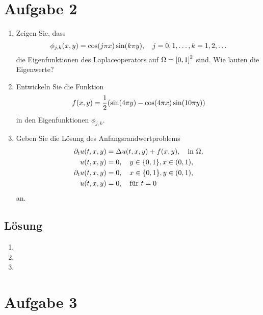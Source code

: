 \documentclass{exercise}
\begin{document}
    \section*{Aufgabe 2}

    \begin{problem}
        \begin{enumerate}
            \item Zeigen Sie, dass
            \[
                \phi_{j, k}\parentheses*{x, y} = \cos\parentheses*{j\pi x}\sin\parentheses*{k\pi y}, \quad j = 0, 1, \ldots, k = 1, 2, \ldots
            \]
            die Eigenfunktionen des Laplaceoperators auf \(\Omega = \brackets*{0, 1}^2\) sind.
            Wie lauten die Eigenwerte?
            \item Entwickeln Sie die Funktion
            \[
                f\parentheses*{x, y} = \frac{1}{2}\parentheses*{\sin\parentheses*{4\pi y} - \cos\parentheses*{4\pi x}\sin\parentheses*{10\pi y}}
            \]
            in den Eigenfunktionen \(\phi_{j, k}\).
            \item Geben Sie die Lösung des Anfangsrandwertproblems
            \begin{align*}
                \partial_t u\parentheses*{t, x, y} &= \Delta u\parentheses*{t, x, y} + f\parentheses*{x, y}, \quad \text{in }\Omega,\\
                u\parentheses*{t, x, y} &= 0, \quad y \in \braces*{0, 1}, x \in \parentheses*{0, 1},\\
                \partial_t u\parentheses*{t, x, y} &= 0, \quad x \in \braces*{0, 1}, y \in \parentheses*{0, 1},\\
                u\parentheses*{t, x, y} &= 0, \quad \text{für }t = 0
            \end{align*}
            an.
        \end{enumerate}
    \end{problem}

    \subsection*{Lösung}
    \begin{enumerate}
        \item
        \item
        \item
    \end{enumerate}


    \section*{Aufgabe 3}
\end{document}
